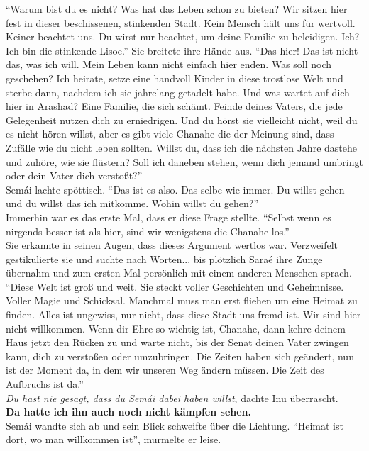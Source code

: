 ``Warum bist du es nicht? Was hat das Leben schon zu bieten? Wir sitzen hier fest in dieser 
beschissenen, stinkenden Stadt. Kein Mensch hält uns für wertvoll. Keiner beachtet uns. Du wirst 
nur beachtet, um deine Familie zu beleidigen. Ich? Ich bin die stinkende Lisoe.'' Sie breitete ihre 
Hände aus. ``Das hier! Das ist nicht das, was ich will. Mein Leben kann nicht einfach hier enden. 
Was soll noch geschehen? Ich heirate, setze eine handvoll Kinder in diese trostlose Welt und sterbe 
dann, nachdem ich sie jahrelang getadelt habe. Und was wartet auf dich hier in Arashad? Eine 
Familie, die sich schämt. Feinde deines Vaters, die jede Gelegenheit nutzen dich zu erniedrigen. 
Und du hörst sie vielleicht nicht, weil du es nicht hören willst, aber es gibt viele Chanahe die 
der Meinung sind, dass Zufälle wie du nicht leben sollten. Willst du, dass ich die nächsten Jahre 
dastehe und zuhöre, wie sie flüstern? Soll ich daneben stehen, wenn dich jemand umbringt oder dein 
Vater dich verstoßt?''\\
Semái lachte spöttisch. ``Das ist es also. Das selbe wie immer. Du willst gehen und du willst das 
ich mitkomme. Wohin willst du gehen?''\\
Immerhin war es das erste Mal, dass er diese Frage stellte. ``Selbst wenn es nirgends besser ist 
als hier, sind wir wenigstens die Chanahe los.''\\
Sie erkannte in seinen Augen, dass dieses Argument wertlos war. Verzweifelt gestikulierte sie und 
suchte nach Worten... bis plötzlich Saraé ihre Zunge übernahm und zum ersten Mal persönlich mit 
einem anderen Menschen sprach. ``Diese Welt ist groß und weit. Sie steckt voller Geschichten und 
Geheimnisse. Voller Magie und Schicksal. Manchmal muss man erst fliehen um eine Heimat zu finden. 
Alles ist ungewiss, nur nicht, dass diese Stadt uns fremd ist. Wir sind hier nicht willkommen. Wenn 
dir Ehre so wichtig ist, Chanahe, dann kehre deinem Haus jetzt den Rücken zu und warte nicht, bis 
der Senat deinen Vater zwingen kann, dich zu verstoßen oder umzubringen. Die Zeiten haben sich 
geändert, nun ist der Moment da, in dem wir unseren Weg ändern müssen. Die Zeit des Aufbruchs ist 
da.''\\
\textit{Du hast nie gesagt, dass du Semái dabei haben willst}, dachte Inu überrascht.\\
\textbf{Da hatte ich ihn auch noch nicht kämpfen sehen.}\\
Semái wandte sich ab und sein Blick schweifte über die Lichtung. ``Heimat ist dort, wo man 
willkommen ist'', murmelte er leise.\\
